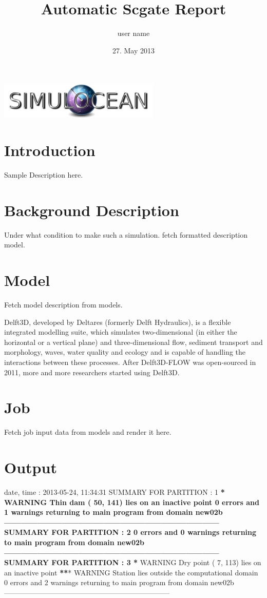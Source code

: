 \documentclass[letterpaper,10pt,openany, oneside]{sphinxmanual}
\title{Automatic Scgate Report}
\date{27. May 2013}
\author{user name}
\begin{document}
\maketitle
\tableofcontents
{}\label{index::doc}
\includegraphics{Simulocean_logo.jpg}




\chapter{Introduction}
\label{introduction:introduction}\label{introduction:automatic-simulocean-report}\label{introduction::doc}
Sample Description here.


\chapter{Background Description}
\label{background:background-description}\label{background::doc}
Under what condition to make such a simulation.
fetch formatted description model.


\chapter{Model}
\label{model:model}\label{model::doc}
Fetch model description from models.

Delft3D, developed by Deltares (formerly Delft Hydraulics), is a flexible integrated modelling suite, which simulates two-dimensional (in either the horizontal or a vertical plane) and three-dimensional flow, sediment transport and morphology, waves, water quality and ecology and is capable of handling the interactions between these processes. After Delft3D-FLOW was open-sourced in 2011, more and more researchers started using Delft3D.


\chapter{Job}
\label{job:job}\label{job::doc}
Fetch job input data from models and render it here.


\chapter{Output}
\label{output:output}\label{output::doc}
date, time : 2013-05-24, 11:34:31
SUMMARY FOR PARTITION : 1
\textbf{* WARNING Thin dam ( 50, 141) lies on an inactive point
0 errors and 1 warnings
returning to main program from domain new02b
------------------------------------------------------------------------------
SUMMARY FOR PARTITION : 2
0 errors and 0 warnings
returning to main program from domain new02b
------------------------------------------------------------------------------
SUMMARY FOR PARTITION : 3
*} WARNING Dry point ( 7, 113) lies on an inactive point
{\color{red}\bfseries{}**}* WARNING Station lies outside the computational domain
0 errors and 2 warnings
returning to main program from domain new02b
---------------------------------------------------------------------
\end{document}
